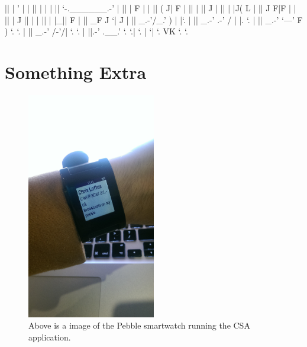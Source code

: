 \documentclass{article}
\begin{document}
           ||                   |      '    |        |
           ||                   |           |        |
           ||                   `-.______.-'         |
           ||                    |    F    |         |
           ||                    (   J|    F         |
           ||                    |   ||   J          |
           ||                    |   |J(   L         |
           ||                    J   F|F   |         |
           ||                    |  J ||   |         |
           ||                    |  |_||   F         |
           ||                   _F  J `|  J          |
           ||               _.-'/_.' ) |  |`.        |
           ||           _.-' .-'  /\/  |  |. `.      |
           ||       _.-'     `---'     F  ) `. `.    |
           ||   _.-'                  /-'/|   `. `.  |
           ||.-'                    .__.'       `. `.|
                                                  `. |
                                                    `|
                                                      `.
  VK                                                    `.
                                                          `.


\fi   

\newpage
\section{Something Extra}
\begin{figure}[H]
\centering
\includegraphics[width=0.5\textwidth]{pebble}
\caption{Above is a image of the Pebble smartwatch running the CSA application.}
\end{figure}
\end{document}
